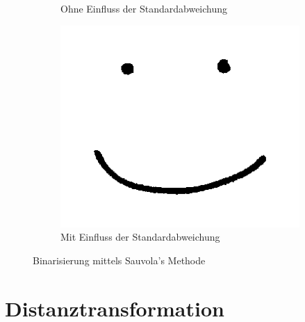 \begin{figure}[htbp]
\begin{subfigure}[t]{0.3\textwidth}
        \caption{Ohne Einfluss der Standardabweichung}%
        \label{fig:essentials_binarize_without_stddev}
    \end{subfigure}
    \hfill
    \begin{subfigure}[t]{0.3\textwidth}
        \centering
        \includegraphics[interpolate=true,width=\textwidth]{images/essentials_binarization_sauvola}
        \caption{Mit Einfluss der Standardabweichung}%
        \label{fig:essentials_binarize_with_stddev}
    \end{subfigure}
    \caption{Binarisierung mittels Sauvola's Methode}%
    \label{fig:essentials_binarize}
\end{figure}

\clearpage
\section{Distanztransformation}%
\label{sec:essentials_distance_transform}

